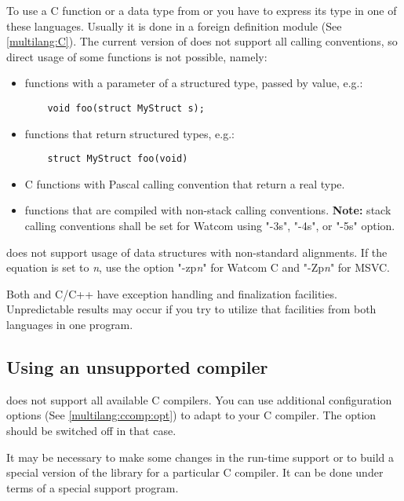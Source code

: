To use a C function or a data type from \mt{} or \ot{} you have
to express its type in one of these languages. Usually
it is done in a foreign definition module (See \ref{multilang:C}).
The current version of \XDS{} does not support
all calling conventions, so direct usage of some functions
is not possible, namely:
\begin{itemize}
\item functions with a parameter of a structured type, passed by value,
      e.g.:

\verb'    void foo(struct MyStruct s);'

\item functions that return structured types, e.g.:

\verb'    struct MyStruct foo(void)'

\item C functions with Pascal calling convention that return
      a real type.

\iflinux \else %
\item functions that are compiled with non-stack calling conventions.
      {\bf Note:} stack calling conventions shall be set for
      Watcom using "-3s", "-4s", or "-5s" option.
\fi
\end{itemize}

\iflinux \else %
  \XDS{} does not support usage of data structures with
  non-standard alignments. If the  equation is set
  to {\em n}, use the option "-zp{\em n}" for Watcom C and
  "-Zp{\em n}" for MSVC.
\fi

Both \mt{} and C/C++ have exception handling and finalization
facilities.  Unpredictable results may occur
if you try to utilize that facilities from both languages in one program.

\iflinux \else %
\subsection{Using an unsupported compiler}

\XDS{} does not support all available C compilers.
You can use additional configuration options (See \ref{multilang:ccomp:opt})
to adapt \XDS{} to your C compiler.
The  option should be switched off in that case.

It may be necessary to make some changes in the run-time support
or to build a special version of the library for a particular C compiler.
It can be done under terms of a special support program.

